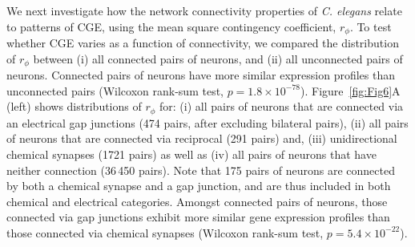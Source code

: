 \documentclass[10pt,letterpaper]{article}
\begin{document}
We next investigate how the network connectivity properties of \emph{C. elegans} relate to patterns of CGE, using the mean square contingency coefficient, $r_\phi$.
To test whether CGE varies as a function of connectivity, we compared the distribution of $r_\phi$ between
(i) all connected pairs of neurons, and
(ii) all unconnected pairs of neurons.
Connected pairs of neurons have more similar expression profiles than unconnected pairs (Wilcoxon rank-sum test, $p = 1.8 \times 10^{-78}$).
Figure~\ref{fig:Fig6}A (left) shows distributions of $r_\phi$ for:
(i) all pairs of neurons that are connected via an electrical gap junctions (474 pairs, after excluding bilateral pairs),
(ii) all pairs of neurons that are connected via reciprocal (291 pairs) and,
(iii) unidirectional chemical synapses (1721 pairs) as well as
(iv) all pairs of neurons that have neither connection (36\,450 pairs).
Note that 175 pairs of neurons are connected by both a chemical synapse and a gap junction, and are thus included in both chemical and electrical categories.
Amongst connected pairs of neurons, those connected via gap junctions exhibit more similar gene expression profiles than those connected via chemical synapses (Wilcoxon rank-sum test, $p = 5.4 \times 10^{-22}$).
\end{document}
